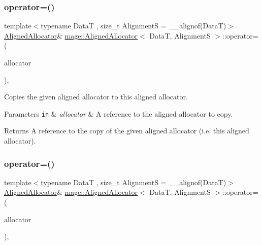 \subsubsection{\texorpdfstring{operator=()}{operator=()}\hspace{0.1cm}{\footnotesize\ttfamily [1/2]}}
{\footnotesize\ttfamily template$<$typename DataT , size\+\_\+t AlignmentS = \+\_\+\+\_\+alignof(\+Data\+T)$>$ \\
\hyperlink{structmage_1_1_aligned_allocator}{Aligned\+Allocator}\& \hyperlink{structmage_1_1_aligned_allocator}{mage\+::\+Aligned\+Allocator}$<$ DataT, AlignmentS $>$\+::operator= (\begin{DoxyParamCaption}\item[{const \hyperlink{structmage_1_1_aligned_allocator}{Aligned\+Allocator}$<$ DataT, AlignmentS $>$ \&}]{allocator }\end{DoxyParamCaption})\hspace{0.3cm}{\ttfamily [delete]}, {\ttfamily [noexcept]}}

Copies the given aligned allocator to this aligned allocator.


\begin{DoxyParams}[1]{Parameters}
\mbox{\tt in}  & {\em allocator} & A reference to the aligned allocator to copy. \\
\hline
\end{DoxyParams}
\begin{DoxyReturn}{Returns}
A reference to the copy of the given aligned allocator (i.\+e. this aligned allocator). 
\end{DoxyReturn}
\hypertarget{structmage_1_1_aligned_allocator_a0fec7e9e30d91e215d33416dde9ef527}{}\label{structmage_1_1_aligned_allocator_a0fec7e9e30d91e215d33416dde9ef527} 
\subsubsection{\texorpdfstring{operator=()}{operator=()}\hspace{0.1cm}{\footnotesize\ttfamily [2/2]}}
{\footnotesize\ttfamily template$<$typename DataT , size\+\_\+t AlignmentS = \+\_\+\+\_\+alignof(\+Data\+T)$>$ \\
\hyperlink{structmage_1_1_aligned_allocator}{Aligned\+Allocator}\& \hyperlink{structmage_1_1_aligned_allocator}{mage\+::\+Aligned\+Allocator}$<$ DataT, AlignmentS $>$\+::operator= (\begin{DoxyParamCaption}\item[{\hyperlink{structmage_1_1_aligned_allocator}{Aligned\+Allocator}$<$ DataT, AlignmentS $>$ \&\&}]{allocator }\end{DoxyParamCaption})\hspace{0.3cm}{\ttfamily [delete]}, {\ttfamily [noexcept]}}

